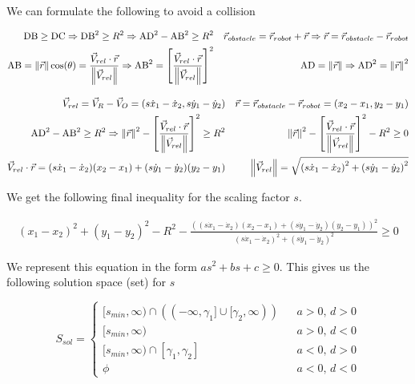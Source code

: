 We can formulate the following to avoid a collision

\begin{align*}
    \textup{DB} \ge \textup{DC} \Rightarrow
    \textup{DB}^2 \ge R^2 \Rightarrow
    \textup{AD}^2 - \textup{AB}^2 \ge R^2
    &&
    \vec{r}_{obstacle} = \vec{r}_{robot} + \vec{r} \Rightarrow 
    \vec{r} = \vec{r}_{obstacle} - \vec{r}_{robot}
    \\
    \textup{AB} = \left \| \vec{r} \right \| \cos(\theta) = \frac{\vec{V}_{rel} \cdot \vec{r}}{\left \| \vec{V}_{rel} \right \|}
    \Rightarrow \textup{AB}^2 = \left [ \frac{\vec{V}_{rel} \cdot \vec{r}}{\left \| \vec{V}_{rel} \right \|} \right ]^2
    &&
    \textup{AD} = \left \| \vec{r} \right \| \Rightarrow \textup{AD}^2 = \left \| \vec{r} \right \|^2
\end{align*}

\begin{align*}
    \vec{V}_{rel} = \vec{V}_{R} - \vec{V}_{O} = (s\dot{x}_1 - \dot{x}_2, s\dot{y}_1 - \dot{y}_2)
    &&
    \vec{r} = \vec{r}_{obstacle} - \vec{r}_{robot} = (x_2 - x_1, y_2 - y_1) \\
    \textup{AD}^2 - \textup{AB}^2 \ge R^2 \Rightarrow 
    \left \| \vec{r} \right \|^2 - \left [ \frac{\vec{V}_{rel} \cdot \vec{r}}{\left \| \vec{V}_{rel} \right \|} \right ]^2 \ge R^2
    &&
    \left \| \vec{r} \right \|^2 - \left [ \frac{\vec{V}_{rel} \cdot \vec{r}}{\left \| \vec{V}_{rel} \right \|} \right ]^2 - R^2 \ge 0
    \\
    \vec{V}_{rel} \cdot \vec{r} = (s\dot{x}_1 - \dot{x}_2) (x_2 - x_1) + (s\dot{y}_1 - \dot{y}_2) (y_2 - y_1)
    &&
    \left \| \vec{V}_{rel} \right \| = \sqrt{\left( s\dot{x}_1 - \dot{x}_2 \right)^2 + \left( s\dot{y}_1 - \dot{y}_2 \right)^2}
\end{align*}

We get the following final inequality for the scaling factor $s$.

\begin{align}
    (x_1 - x_2)^2 + (y_1 - y_2)^2 - R^2 - \frac{\left( (s\dot{x}_1 - \dot{x}_2) (x_2 - x_1) + (s\dot{y}_1 - \dot{y}_2) (y_2 - y_1) \right)^2}{\left( s\dot{x}_1 - \dot{x}_2 \right)^2 + \left( s\dot{y}_1 - \dot{y}_2 \right)^2} \ge 0
    \label{eq:cc-cts-rawineq}
\end{align}

We represent this equation in the form $a s^2 + b s + c \ge 0$. This gives us the following solution space (set) for $s$

\begin{equation}
    S_{sol} = \left\{\begin{matrix}
        [s_{min}, \infty) \cap \left ( (-\infty, \gamma_1] \cup [\gamma_2, \infty) \right ) && a > 0,\, d > 0 \\
        [s_{min}, \infty) && a > 0,\, d < 0 \\
        [s_{min}, \infty) \cap [\gamma_1, \gamma_2] && a < 0 ,\, d > 0 \\
        \phi && a < 0 ,\, d < 0
    \end{matrix}\right.
    \label{eq:cc-cts-solspace-s}
\end{equation}

